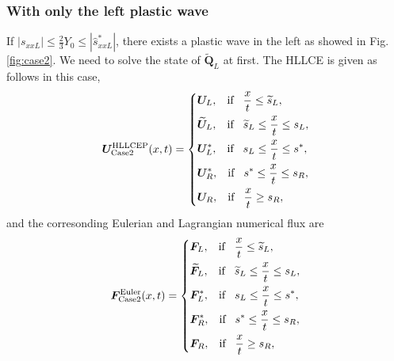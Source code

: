 \documentclass{article}
\theoremstyle{plain}\newtheorem{definition}{\sc{Definition}}
\theoremstyle{defination}\newtheorem{example}{Example}[section]
\numberwithin{equation}{section}
\numberwithin{table}{section}
\begin{document}
 \subsubsection{ With only the left plastic wave}
 If $|s_{xxL}| \le \frac{2}{3}Y_0 \le  |\hat{s}_{xxL}^*|$, there exists a plastic wave in the left as showed in Fig.\ref{fig:case2}. We need to solve the state  of $\widetilde{\bm{Q}}_L$ at first. The HLLCE is given as follows in this case,
 \begin{equation}\label{eq:HLLCEP2}
   \bm{U}^{\text{HLLCEP}}_{\text{Case2}}(x,t) = \left\{ \begin{aligned}
	   & \bm{U}_L, \hspace{0.3cm} \text{if} \hspace{0.3cm} \frac{x}{t}\le \widetilde{s}_L, \\
		&  \widetilde{\bm{U}}_L, \hspace{0.3cm} \text{if} \hspace{0.3cm} \widetilde{s}_L\le \frac{x}{t} \le  s_L, \\
		&\bm{U}_L^*, \hspace{0.3cm} \text{if} \hspace{0.3cm} s_L\le \frac{x}{t} \le s^*, \\
		& \bm{U}_R^*, \hspace{0.3cm} \text{if} \hspace{0.3cm} s^*\le \frac{x}{t} \le s_R,\\
		& \bm{U}_R, \hspace{0.3cm} \text{if} \hspace{0.3cm} \frac{x}{t}\ge s_R, \\
	  \end{aligned}
	\right.
  \end{equation}
  and the corresonding Eulerian and Lagrangian numerical flux are 
 \begin{equation}\label{eq:HLLCEP}
   \bm{F}^{\text{Euler}}_{\text{Case2}}(x,t) = \left\{ \begin{aligned}
	   & \bm{F}_L, \hspace{0.3cm} \text{if} \hspace{0.3cm} \frac{x}{t}\le \widetilde{s}_L, \\
		&  \widetilde{\bm{F}}_L, \hspace{0.3cm} \text{if} \hspace{0.3cm} \widetilde{s}_L\le \frac{x}{t} \le   s_L , \\
		&\bm{F}_L^*, \hspace{0.3cm} \text{if} \hspace{0.3cm} s_L\le \frac{x}{t} \le s^*, \\
		& \bm{F}_R^*, \hspace{0.3cm} \text{if} \hspace{0.3cm} s^*\le \frac{x}{t} \le s_R,\\
		& \bm{F}_R, \hspace{0.3cm} \text{if} \hspace{0.3cm} \frac{x}{t}\ge s_R, \\
	  \end{aligned}
	\right.
  \end{equation}
\end{document}
